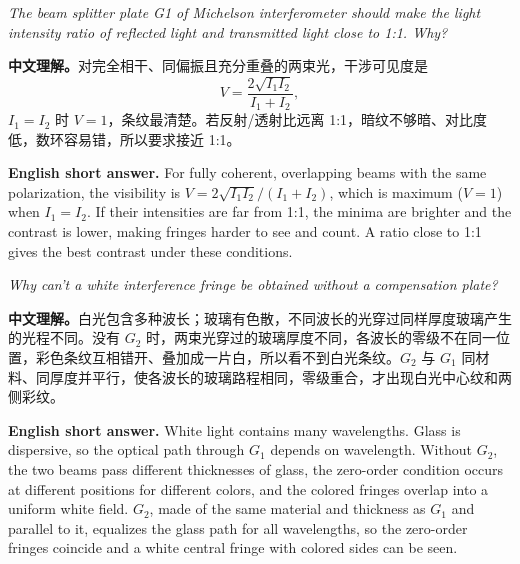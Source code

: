 \documentclass[11pt]{ctexart}
\begin{document}

\textit{The beam splitter plate G1 of Michelson interferometer should make the light intensity ratio of reflected light and transmitted light close to 1:1. Why?}

\textbf{中文理解。}对完全相干、同偏振且充分重叠的两束光，干涉可见度是
\[
V=\frac{2\sqrt{I_1I_2}}{I_1+I_2},
\]
\(I_1=I_2\) 时 \(V=1\)，条纹最清楚。若反射/透射比远离 1:1，暗纹不够暗、对比度低，数环容易错，所以要求接近 1:1。

\textbf{English short answer.} For fully coherent, overlapping beams with the same polarization, the visibility is \(V=2\sqrt{I_1I_2}/(I_1+I_2)\), which is maximum (\(V=1\)) when \(I_1=I_2\). If their intensities are far from 1:1, the minima are brighter and the contrast is lower, making fringes harder to see and count. A ratio close to 1:1 gives the best contrast under these conditions.


\textit{Why can't a white interference fringe be obtained without a compensation plate?}

\textbf{中文理解。}白光包含多种波长；玻璃有色散，不同波长的光穿过同样厚度玻璃产生的光程不同。没有 \(G_2\) 时，两束光穿过的玻璃厚度不同，各波长的零级不在同一位置，彩色条纹互相错开、叠加成一片白，所以看不到白光条纹。\(G_2\) 与 \(G_1\) 同材料、同厚度并平行，使各波长的玻璃路程相同，零级重合，才出现白光中心纹和两侧彩纹。

\textbf{English short answer.} White light contains many wavelengths. Glass is dispersive, so the optical path through \(G_1\) depends on wavelength. Without \(G_2\), the two beams pass different thicknesses of glass, the zero-order condition occurs at different positions for different colors, and the colored fringes overlap into a uniform white field. \(G_2\), made of the same material and thickness as \(G_1\) and parallel to it, equalizes the glass path for all wavelengths, so the zero-order fringes coincide and a white central fringe with colored sides can be seen.


\end{document}

